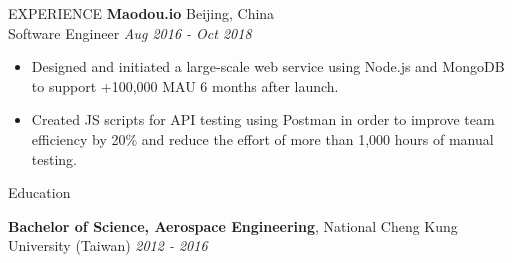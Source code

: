 \documentclass{resume} %
\begin{document}
\begin{rSection}{EXPERIENCE}
\textbf{Maodou.io} \hfill Beijing, China\\
Software Engineer  \hfill \textit{Aug 2016 - Oct 2018}
 \begin{itemize}
    \itemsep -3pt {}
    \item Designed and initiated a large-scale web service using Node.js and MongoDB to support +100,000 MAU 6 months after launch.
    \item  Created JS scripts for API testing using Postman in order to improve team efficiency by 20\% and reduce the effort of more than 1,000 hours of manual testing.
 \end{itemize}

\end{rSection} 


\begin{rSection}{Education}
\vspace{-1.25em}
\item {\bf Bachelor of Science, Aerospace Engineering}, 
National Cheng Kung University (Taiwan) \hfill {\textit{2012 - 2016}}
\end{rSection}
\end{document}
